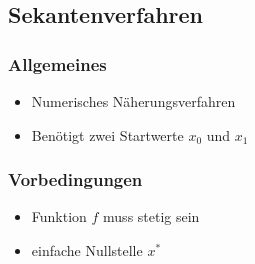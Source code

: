 \documentclass[table]{beamer}
\begin{document}
\subsection{Sekantenverfahren}
\begin{frame}
\frametitle{Allgemeines}
\begin{itemize}
	\item Numerisches Näherungsverfahren
	\item Benötigt zwei Startwerte $x_0$ und $x_1$	
\end{itemize}
\end{frame}
\begin{frame}
\frametitle{Vorbedingungen}
\begin{itemize}
\item Funktion $f$ muss stetig sein
\item einfache Nullstelle $x^*$	
\end{itemize}
\end{frame}
\end{document}
